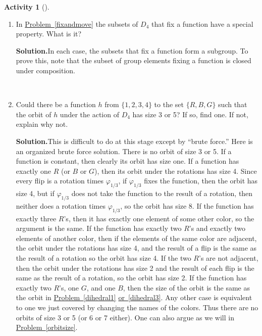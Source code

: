 \documentclass[10pt,]{book}
\theoremstyle{plain}
\theoremstyle{definition}
\newtheorem{activity}[project]{Activity}
\numberwithin{equation}{chapter}
\begin{document}
\begin{activity}[]\label{subgroupfixingfunction}
~\par
\begin{enumerate}[label=(\alph*)]
 \item In \hyperref[fixandmove]{Problem~\ref{fixandmove}} the subsets of \(D_4\) that fix a function have a special property. What is it?%
\par\medskip\noindent%
\textbf{Solution.}\quad In each case, the subsets that fix a function form a subgroup. To prove this, note that the subset of group elements fixing a function is closed under composition.%

~\par
\item Could there be a function \(h\) from \(\{1,2,3,4\}\) to the set \(\{R, B,
G\}\) such that the orbit of \(h\) under the action of \(D_4\) has size 3 or 5? If so, find one. If not, explain why not.%
\par\medskip\noindent%
\textbf{Solution.}\quad This is difficult to do at this stage except by ``brute force.'' Here is an organized brute force solution. There is no orbit of size 3 or 5. If a function is constant, then clearly its orbit has size one. If a function has exactly one \(R\) (or \(B\) or \(G\)), then its orbit under the rotations has size 4. Since every flip is a rotation times \(\varphi_{1/3}\), if \(\varphi_{1/3}\) fixes the function, then the orbit has size 4, but if \(\varphi_{1/3}\) does not take the function to the result of a rotation, then neither does a rotation times \(\varphi_{1/3}\), so the orbit has size 8. If the function has exactly three \(R\)'s, then it has exactly one element of some other color, so the argument is the same. If the function has exactly two \(R\)'s and exactly two elements of another color, then if the elements of the same color are adjacent, the orbit under the rotations has size 4, and the result of a flip is the same as the result of a rotation so the orbit has size 4. If the two \(R\)'s are not adjacent, then the orbit under the rotations has size 2 and the result of each flip is the same as the result of a rotation, so the orbit has size 2. If the function has exactly two \(R\)'s, one \(G\), and one \(B\), then the size of the orbit is the same as the orbit in \hyperref[dihedral1]{Problem~\ref{dihedral1}} \hyperref[dihedral3]{or~\ref{dihedral3}}. Any other case is equivalent to one we just covered by changing the names of the colors. Thus there are no orbits of size 3 or 5 (or 6 or 7 either). One can also argue as we will in \hyperref[orbitsize]{Problem~\ref{orbitsize}}.%

\end{enumerate}
\end{activity}
\end{document}
